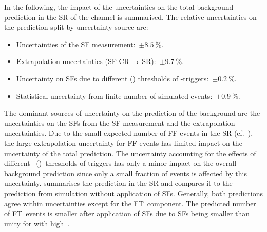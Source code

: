 In the following, the impact of the uncertainties on the total \ttbarFakes
background prediction in the SR of the \hadhad channel is summarised. The
relative uncertainties on the prediction split by uncertainty source are:
\begin{itemize}

\item Uncertainties of the SF measurement:~$\pm \SI{8.5}{\percent}$.

\item Extrapolation uncertainties (SF-CR $\rightarrow$ \hadhad
  SR):~$\pm \SI{9.7}{\percent}$.

\item Uncertainty on SFs due to different \pT (\ET) thresholds of
  \tauhadvis-triggers:~$\pm \SI{0.2}{\percent}$.

\item Statistical uncertainty from finite number of simulated
  events:~$\pm \SI{0.9}{\percent}$.

\end{itemize}
The dominant sources of uncertainty on the prediction of the \ttbarFakes
background are the uncertainties on the SFs from the SF measurement and the
extrapolation uncertainties. Due to the small expected number of FF events in
the \hadhad SR (cf.~), the large extrapolation
uncertainty for FF events has limited impact on the uncertainty of the total
\ttbarFakes prediction. The uncertainty accounting for the effects of different
\pT~(\ET)~thresholds of \tauhadvis triggers has only a minor impact on the
overall \ttbarFakes background prediction since only a small fraction of events
is affected by this uncertainty.  summarises the
\ttbarFakes prediction in the \hadhad SR and compares it to the prediction from
simulation without application of \faketauhadvis SFs. Generally, both
predictions agree within uncertainties except for the FT~component. The
predicted number of FT~events is smaller after application of \ttbarFake SFs due
to SFs being smaller than unity for \faketauhadvis with high~\pT.


